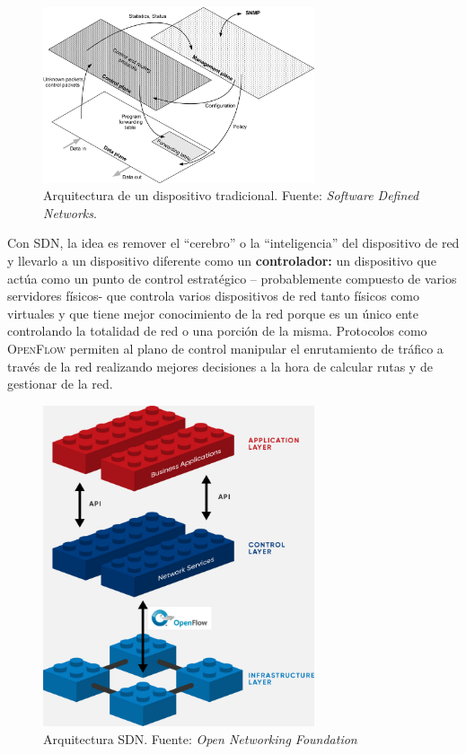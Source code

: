 \documentclass[10pt,journal,compsoc]{IEEEtran}
\begin{document}
\begin{figure}[h]
    \centering
    \includegraphics[width=8cm]{traditional-3-tier-device}
    \caption{Arquitectura de un dispositivo tradicional. Fuente: \emph{Software Defined Networks}\cite{goransson}.}
    \label{fig:tradicitional-architecture}
\end{figure}




Con SDN, la idea es remover el ``cerebro'' o la ``inteligencia'' del dispositivo de red y llevarlo a un dispositivo diferente como un \textbf{controlador:} un dispositivo que actúa como un punto de control estratégico -- probablemente compuesto de varios servidores físicos- que controla varios dispositivos de red tanto físicos como virtuales y que tiene mejor conocimiento de la red porque es un único ente controlando la totalidad de red o una porción de la misma. Protocolos como \textsc{OpenFlow} permiten al plano de control manipular el enrutamiento de tráfico a través de la red realizando mejores decisiones a la hora de calcular rutas y de gestionar de la red.

\begin{figure}[h]
    \centering
    \includegraphics[width=8cm]{sdn-architecture-img}
    \caption{Arquitectura SDN. Fuente: \emph{Open Networking Foundation}}
    \label{fig:sdn-arquitectura}
\end{figure}
\end{document}

